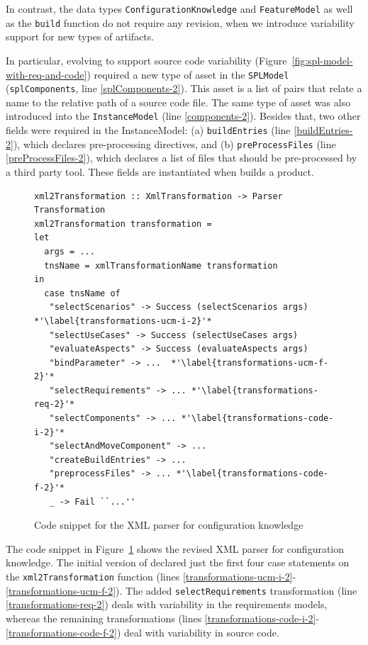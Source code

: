 In contrast, the data types \texttt{ConfigurationKnowledge} and
\texttt{FeatureModel} as well as the \texttt{build} function do not
require any revision, when we introduce variability support for new
types of artifacts.

In particular, evolving \hp{} to support source code variability
(Figure~\ref{fig:spl-model-with-req-and-code}) required a new type of
asset in the \texttt{SPLModel} (\texttt{splComponents}, line
\ref{splComponents-2}). This asset is a list of pairs that relate a
name to the relative path of a source code file. The same type of
asset was also introduced into the \texttt{InstanceModel} (line
\ref{components-2}). Besides that, two other fields were required in
the InstanceModel: (a) \texttt{buildEntries} (line
\ref{buildEntries-2}), which declares pre-processing directives, and
(b) \texttt{preProcessFiles} (line \ref{preProcessFiles-2}), which
declares a list of files that should be pre-processed by a third party
tool. These fields are instantiated when \hp{} builds a product.


\begin{figure}[t!]
\begin{lstlisting}
xml2Transformation :: XmlTransformation -> Parser Transformation
xml2Transformation transformation =
let
  args = ...
  tnsName = xmlTransformationName transformation
in
  case tnsName of
   "selectScenarios" -> Success (selectScenarios args) *'\label{transformations-ucm-i-2}'*
   "selectUseCases" -> Success (selectUseCases args)
   "evaluateAspects" -> Success (evaluateAspects args)
   "bindParameter" -> ...  *'\label{transformations-ucm-f-2}'*
   "selectRequirements" -> ... *'\label{transformations-req-2}'*
   "selectComponents" -> ... *'\label{transformations-code-i-2}'*
   "selectAndMoveComponent" -> ...
   "createBuildEntries" -> ...
   "preprocessFiles" -> ... *'\label{transformations-code-f-2}'*
   _ -> Fail ``...''
\end{lstlisting}
\caption{Code snippet for the XML parser for configuration knowledge}
\label{fig:xml-transformation-parser}
\end{figure}


The code snippet in Figure~\ref{fig:xml-transformation-parser} shows
the revised XML parser for configuration knowledge. The initial
version of \hp{} declared just the first four case statements on the
\texttt{xml2Transformation} function (lines
\ref{transformations-ucm-i-2}-\ref{transformations-ucm-f-2}). The
added \texttt{selectRequirements} transformation (line
\ref{transformations-req-2}) deals with variability in the
requirements models, whereas the remaining transformations (lines
\ref{transformations-code-i-2}-\ref{transformations-code-f-2}) deal
with variability in source code. 

